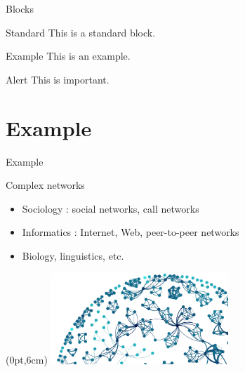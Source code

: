 \documentclass{beamer}
\begin{document}
\begin{frame}{Blocks}

\begin{block}{Standard}
This is a standard block.
\end{block}

\begin{exampleblock}{Example}
This is an example.
\end{exampleblock}

\begin{alertblock}{Alert}
This is important.
\end{alertblock}
\end{frame}


\section{Example}

\begin{frame}{Example}

\begin{block}{Complex networks}
\begin{itemize}
\item Sociology : social networks, call networks
\item Informatics : Internet, Web, peer-to-peer networks
\item Biology, linguistics, etc.
\end{itemize}
\end{block}

\vspace{1.6cm}

\begin{textblock*}{\paperwidth}(0pt,6cm)
    \raggedleft \includegraphics[width=0.5\textwidth]{static-graph1}
\end{textblock*}
\end{frame}
\end{document}
